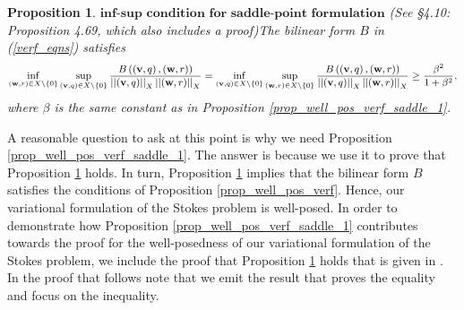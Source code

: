 \documentclass[12pt,a4paper]{article}
\newtheorem{proposition}[theorem]{Proposition}
\theoremstyle{definition}
\begin{document}
\begin{proposition}{$\textbf{inf-sup condition for saddle-point formulation}$} (See \cite{verfurth2013posteriori} \S 4.10: Proposition 4.69, which also includes a proof)\label{prop_well_pos_verf_saddle}
	The bilinear form $B$ in (\ref{verf_eqns}) satisfies
	\begin{equation}\small
	\begin{aligned}
	\inf_{\left(\textbf{w},r\right)\in X\setminus \lbrace0\rbrace}\sup_{\left(\textbf{v},q\right) \in X\setminus \lbrace0\rbrace}\frac{B\left(\left(\textbf{v},q\right),\left(\textbf{w},r\right)\right)}{\left|\left|\left(\textbf{v},q\right)\right|\right|_X\left|\left|\left(\textbf{w},r\right)\right|\right|_X}=
	\inf_{\left(\textbf{v},q\right) \in X\setminus \lbrace 0\rbrace}\sup_{\left(\textbf{w},r\right)\in X\setminus \lbrace0\rbrace}\frac{B\left(\left(\textbf{v},q\right),\left(\textbf{w},r\right)\right)}{\left|\left|\left(\textbf{v},q\right)\right|\right|_X\left|\left|\left(\textbf{w},r\right)\right|\right|_X}\geq \frac{\beta^2}{1+\beta^2},\nonumber
	\end{aligned}
	\end{equation}
	where $\beta$ is the same constant as in Proposition \ref{prop_well_pos_verf_saddle_1}.
\end{proposition}
A reasonable question to ask at this point is why we need Proposition \ref{prop_well_pos_verf_saddle_1}.  The answer is because we use it to prove that Proposition \ref{prop_well_pos_verf_saddle} holds.  In turn, Proposition \ref{prop_well_pos_verf_saddle} implies that the bilinear form $B$ satisfies the conditions of Proposition \ref{prop_well_pos_verf}.  Hence, our variational formulation of the Stokes problem is well-posed.  In order to demonstrate how Proposition \ref{prop_well_pos_verf_saddle_1} contributes towards the proof for the well-posedness of our variational formulation of the Stokes problem, we include the proof that Proposition \ref{prop_well_pos_verf_saddle} holds that is given in \cite[\S4.10.1: Proposition 4.69]{verfurth2013posteriori}.  In the proof that follows note that we emit the result that proves the equality and focus on the inequality.
\end{document}
